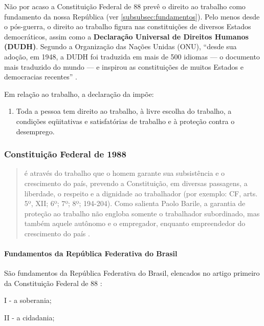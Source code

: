 \documentclass[]{article}
\providecommand{\tightlist}{%
  \setlength{\itemsep}{0pt}\setlength{\parskip}{0pt}}
\let\oldparagraph\paragraph
\renewcommand{\paragraph}[1]{\oldparagraph{#1}\mbox{}}
\begin{document}
Não por acaso a Constituição Federal de 88 prevê o direito ao trabalho
como fundamento da nossa República (ver
\autoref{subsubsec:fundamentos}). Pelo menos desde o pós-guerra, o
direito ao trabalho figura nas constituições de diversos Estados
democráticos, assim como a \textbf{Declaração Universal de Direitos
Humanos (DUDH)}. Segundo a Organização das Nações Unidas (ONU), ``desde
sua adoção, em 1948, a DUDH foi traduzida em mais de 500 idiomas --- o
documento mais traduzido do mundo --- e inspirou as constituições de
muitos Estados e democracias recentes'' \cite{dudh}.

Em relação ao trabalho, a declaração da 
impõe:

\begin{enumerate}
\def\labelenumi{\arabic{enumi}.}
\tightlist
\item
  Toda a pessoa tem direito ao trabalho, à livre escolha do trabalho, a
  condições eqüitativas e satisfatórias de trabalho e à proteção contra
  o desemprego.
\end{enumerate}

\subsubsection{Constituição Federal de
1988}\label{constituicao-federal-de-1988}

\begin{quote}
é através do trabalho que o homem garante sua subsistência e o
crescimento do país, prevendo a Constituição, em diversas passagens, a
liberdade, o respeito e a dignidade ao trabalhador (por exemplo: CF,
arts. 5º, XII; 6º; 7º; 8º; 194-204). Como salienta Paolo Barile, a
garantia de proteção ao trabalho não engloba somente o trabalhador
subordinado, mas também aquele autônomo e o empregador, enquanto
empreendedor do crescimento do país .
\end{quote}

\paragraph{Fundamentos da República Federativa do
Brasil}\label{subsubsec:fundamentos}

São fundamentos da República Federativa do Brasil, elencados no artigo
primeiro da Constituição Federal de 88 \cite[grifo nosso]{cf88}:

I - a soberania;

II - a cidadania;
\end{document}

